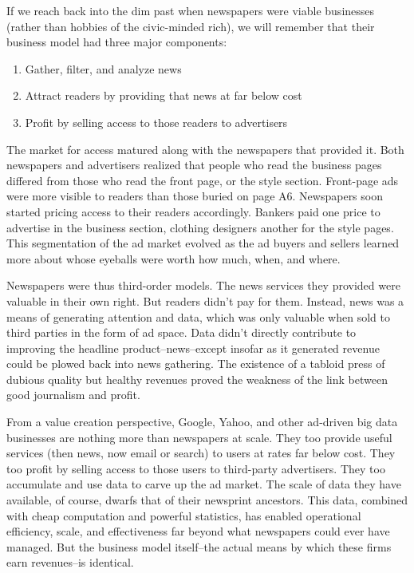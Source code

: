 \documentclass[12pt]{article}
\begin{document}
If we reach back into the dim past when newspapers were viable
businesses (rather than hobbies of the civic-minded rich), we will
remember that their business model had three major components:

\begin{enumerate}
\item Gather, filter, and analyze news
\item Attract readers by providing that news at far below cost
\item Profit by selling access to those readers to advertisers
\end{enumerate}

The market for access matured along with the newspapers that provided
it. Both newspapers and advertisers realized that people who read the business
pages differed from those who read the front page, or the style
section. Front-page ads were more visible to readers than those buried
on page A6. Newspapers soon started pricing access to their readers
accordingly. Bankers paid one price to advertise in the business
section, clothing designers another for the style pages. This
segmentation of the ad market evolved as the ad buyers and sellers
learned more about whose eyeballs were worth how much, when, and
where.

Newspapers were thus third-order models. The news services they
provided were valuable in their own right. But readers didn't pay for
them. Instead, news was a means of generating attention and data,
which was only valuable when sold to third parties in the form of ad
space. Data didn't directly contribute to improving the headline
product--news--except insofar as it generated revenue could be plowed
back into news gathering. The existence of a tabloid press of dubious
quality but healthy revenues proved the weakness of the link between
good journalism and profit.

From a value creation perspective, Google, Yahoo, and other ad-driven
big data businesses are nothing more than newspapers at scale. They
too provide useful services (then news, now email or search) to users
at rates far below cost. They too profit by selling access to those
users to third-party advertisers. They too accumulate and use data to
carve up the ad market. The scale of data they have available, of
course, dwarfs that of their newsprint ancestors. This data, combined
with cheap computation and powerful statistics, has enabled
operational efficiency, scale, and effectiveness far beyond what
newspapers could ever have managed. But the business model
itself--the actual means by which these firms earn revenues--is
identical.
\end{document}
